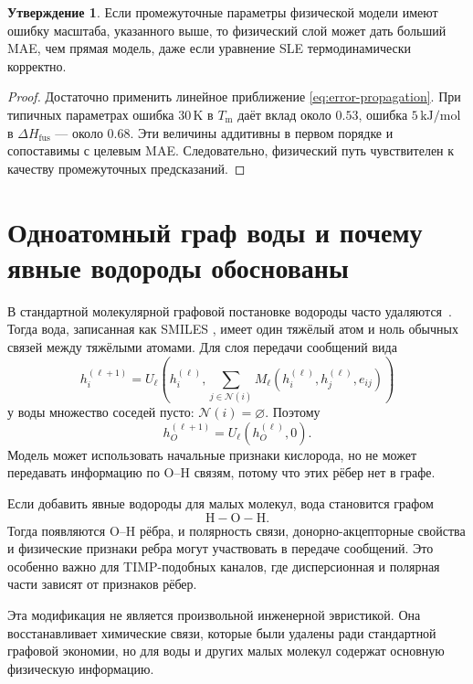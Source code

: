 \documentclass[11pt]{article}
\DeclareRobustCommand{\code}[1]{\texttt{\detokenize{#1}}}
\newcommand{\Tm}{T_{\mathrm m}}
\newcommand{\dHfus}{\Delta H_{\mathrm{fus}}}
\theoremstyle{definition}
\newtheorem{claim}{Утверждение}[section]
\begin{document}
\begin{claim}
Если промежуточные параметры физической модели имеют ошибку масштаба, указанного выше, то физический слой может дать больший MAE, чем прямая модель, даже если уравнение SLE термодинамически корректно.
\end{claim}

\begin{proof}
Достаточно применить линейное приближение \eqref{eq:error-propagation}. При типичных параметрах ошибка $30\,\mathrm K$ в $\Tm$ даёт вклад около $0.53$, ошибка $5\,\mathrm{kJ/mol}$ в $\dHfus$ --- около $0.68$. Эти величины аддитивны в первом порядке и сопоставимы с целевым MAE. Следовательно, физический путь чувствителен к качеству промежуточных предсказаний.
\end{proof}

\section{Одноатомный граф воды и почему явные водороды обоснованы}
\label{app:water}

В стандартной молекулярной графовой постановке водороды часто удаляются~\cite{landrum2024,gilmer2017}. Тогда вода, записанная как SMILES \code{O}, имеет один тяжёлый атом и ноль обычных связей между тяжёлыми атомами. Для слоя передачи сообщений вида
\begin{equation*}
    h_i^{(\ell+1)}
    =
    U_\ell\!\left(
        h_i^{(\ell)},
        \sum_{j\in\mathcal N(i)}
        M_\ell(h_i^{(\ell)},h_j^{(\ell)},e_{ij})
    \right)
\end{equation*}
у воды множество соседей пусто: $\mathcal N(i)=\varnothing$. Поэтому
\begin{equation*}
    h_O^{(\ell+1)}=U_\ell(h_O^{(\ell)},0).
\end{equation*}
Модель может использовать начальные признаки кислорода, но не может передавать информацию по O--H связям, потому что этих рёбер нет в графе.

Если добавить явные водороды для малых молекул, вода становится графом
\begin{equation*}
    \mathrm{H{-}O{-}H}.
\end{equation*}
Тогда появляются O--H рёбра, и полярность связи, донорно-акцепторные свойства и физические признаки ребра могут участвовать в передаче сообщений. Это особенно важно для TIMP-подобных каналов, где дисперсионная и полярная части зависят от признаков рёбер.

Эта модификация не является произвольной инженерной эвристикой. Она восстанавливает химические связи, которые были удалены ради стандартной графовой экономии, но для воды и других малых молекул содержат основную физическую информацию.
\end{document}
